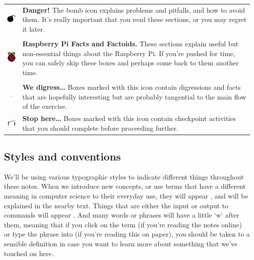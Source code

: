 \begin{tabular}{m{1.5cm}m{12cm}}
{\includegraphics[width=1.5cm]{images/bomb}} & \textbf{Danger!} The bomb icon explains problems and pitfalls, and how to avoid them. It's really important that you read these sections, or you may regret it later.\\
\\
\includegraphics[width=1.5cm]{images/rpi-logo} & \textbf{Raspberry Pi Facts and Factoids.} These sections explain useful but non-essential things about the Raspberry Pi. If you're pushed for time, you can safely skip these boxes and perhaps come back to them another time.\\
\\
\includegraphics[width=1.5cm]{images/diversion} & \textbf{We digress\ldots} Boxes marked with this icon contain digressions and facts that are hopefully interesting but are probably tangential to the main flow of the exercise.\\
\includegraphics[width=1.5cm]{images/roadblock} & \textbf{Stop here\ldots} Boxes marked with this icon contain checkpoint activities that you should complete before proceeding further.\\
\end{tabular}

\subsection{Styles and conventions}

We'll be using various typographic styles to indicate different things throughout these notes. When we introduce new concepts, or use terms that have a different meaning in computer science to their everyday use, they will appear , and will be explained in the nearby text. Things that are either the input or output to commands will appear . And many words or phrases will have a little `w' after them, meaning that if you click on the term (if you're reading the notes online) or type the phrase into  (if you're reading this on paper), you should be taken to a sensible definition in case you want to learn more about something that we've touched on here.

